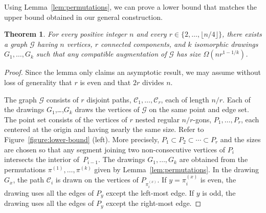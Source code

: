 \documentclass[11pt]{patmorin}
\newtheorem{theorem}{Theorem}[section]
\begin{document}
Using Lemma~\ref{lem:permutations}, we can prove a lower bound that matches the upper bound obtained in our general construction.

\begin{theorem}\label{thm:lower-bound}
  For every positive integer $n$ and every $r\in\{2,\ldots,\lfloor n/4\rfloor\}$,
  there exists a graph $\mathcal G$ having $n$ vertices, $r$ connected
  components, and $k$ isomorphic drawings $G_1,\ldots,G_k$ such that
  any compatible augmentation of $\mathcal G$ has size $\Omega(nr^{1-1/k})$.
\end{theorem}

\begin{proof}
Since the lemma only claims an asymptotic result, we may assume without
loss of generality that $r$ is even and that $2r$ divides $n$.

The graph $\mathcal G$ consists of $r$ disjoint paths,
$\mathcal{C}_1,\ldots,\mathcal{C}_r$, each of length $n/r$.  Each of the
drawings $G_1$,\ldots,$G_k$ draws the vertices of $\mathcal G$ on the
same point and edge set. The point set consists of the vertices of
$r$ nested regular $n/r$-gons, $P_1,\ldots,P_r$, each centered at the
origin and having nearly the same size. Refer to Figure~\ref{figure:lower-bound} (left). More precisely, $P_1\subset
P_2\subset\cdots\subset P_r$ and the sizes are chosen so that any segment
joining two non-consecutive vertices of $P_i$ intersects the interior
of~$P_{i-1}$.
The drawings $G_1,\ldots,G_k$ are obtained from the permutations
$\pi^{(1)},\ldots,\pi^{(k)}$ given by \linebreak Lemma~\ref{lem:permutations}.
In the drawing $G_x$, the path $\mathcal C_i$ is drawn on the vertices
of $P_{\pi^{(x)}_i}$. If $y=\pi^{(x)}_i$ is even, the drawing uses
all the edges of $P_y$ except the left-most edge.  If $y$ is odd, the
drawing uses all the edges of $P_y$ except the right-most edge.


\end{proof}
\end{document}
